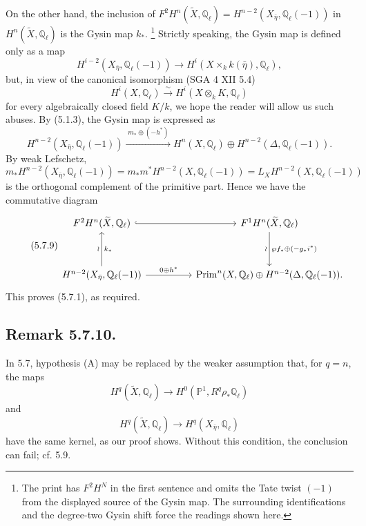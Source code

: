 On the other hand, the inclusion of
$F^2H^n(\widetilde X,\mathbb Q_\ell)
=H^{n-2}(X_{\bar\eta},\mathbb Q_\ell(-1))$
in $H^n(\widetilde X,\mathbb Q_\ell)$ is the Gysin map $k_*$.
\footnote{The print has $F^2H^N$ in the first sentence and omits the
Tate twist $(-1)$ from the displayed source of the Gysin map.  The
surrounding identifications and the degree-two Gysin shift force the readings
shown here.}
Strictly speaking, the Gysin map is defined only as a map
\[
H^{i-2}(X_{\bar\eta},\mathbb Q_\ell(-1))
\longrightarrow
H^i(X\times_k k(\bar\eta),\mathbb Q_\ell),
\]
but, in view of the canonical isomorphism (SGA 4 XII 5.4)
\[
H^i(X,\mathbb Q_\ell)\xrightarrow{\sim}
H^i(X\otimes_kK,\mathbb Q_\ell)
\]
for every algebraically closed field $K/k$, we hope the reader will allow
us such abuses.
By (5.1.3), the Gysin map is expressed as
\begin{equation}\tag{5.7.8}
H^{n-2}(X_{\bar\eta},\mathbb Q_\ell(-1))
\xrightarrow{\;m_*\oplus(-h^*)\;}
H^n(X,\mathbb Q_\ell)
\oplus H^{n-2}(\Delta,\mathbb Q_\ell(-1)).
\end{equation}
By weak Lefschetz,
\[
m_*H^{n-2}(X_{\bar\eta},\mathbb Q_\ell(-1))
=m_*m^*H^{n-2}(X,\mathbb Q_\ell(-1))
=L_XH^{n-2}(X,\mathbb Q_\ell(-1))
\]
is the orthogonal complement of the primitive part.  Hence we have the
commutative diagram
\begin{equation}\tag{5.7.9}
\begin{tikzcd}[column sep=huge,row sep=huge]
F^2H^n(\widetilde X,\mathbb Q_\ell)
  \arrow[r,hook]
& F^1H^n(\widetilde X,\mathbb Q_\ell)
  \arrow[d,"\wp f_*\oplus(-g_*i^*)","\wr"']
\\
H^{n-2}(X_{\bar\eta},\mathbb Q_\ell(-1))
  \arrow[u,"k_*"',"\wr"]
  \arrow[r,"0\oplus h^*"]
& \operatorname{Prim}^n(X,\mathbb Q_\ell)
  \oplus H^{n-2}(\Delta,\mathbb Q_\ell(-1)).
\end{tikzcd}
\end{equation}
This proves (5.7.1), as required.

\subsection*{Remark 5.7.10.}
In 5.7, hypothesis (A) may be replaced by the weaker assumption that, for
$q=n$, the maps
\begin{equation}\tag{5.7.11}
H^q(\widetilde X,\mathbb Q_\ell)\longrightarrow
H^0(\mathbb P^1,R^q\rho_*\mathbb Q_\ell)
\end{equation}
and
\begin{equation}\tag{5.7.12}
H^q(\widetilde X,\mathbb Q_\ell)\longrightarrow
H^q(X_{\bar\eta},\mathbb Q_\ell)
\end{equation}
have the same kernel, as our proof shows.  Without this condition, the
conclusion can fail; cf. 5.9.
